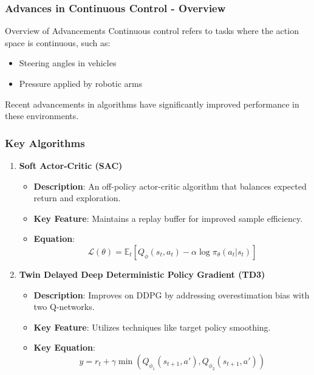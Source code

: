 \documentclass[aspectratio=169]{beamer}
\begin{document}
\begin{frame}[fragile]
    \frametitle{Advances in Continuous Control - Overview}
    \begin{block}{Overview of Advancements}
        Continuous control refers to tasks where the action space is continuous, such as:
        \begin{itemize}
            \item Steering angles in vehicles
            \item Pressure applied by robotic arms
        \end{itemize}
        Recent advancements in algorithms have significantly improved performance in these environments.
    \end{block}
\end{frame}

\begin{frame}[fragile]
    \frametitle{Key Algorithms}
    \begin{enumerate}
        \item \textbf{Soft Actor-Critic (SAC)}
            \begin{itemize}
                \item \textbf{Description}: An off-policy actor-critic algorithm that balances expected return and exploration.
                \item \textbf{Key Feature}: Maintains a replay buffer for improved sample efficiency.
                \item \textbf{Equation}:
                \begin{equation}
                    \mathcal{L}(\theta) = \mathbb{E}_{t}\left[Q_{\phi}(s_t, a_t) - \alpha \log \pi_{\theta}(a_t|s_t)\right]
                \end{equation}
            \end{itemize}

        \item \textbf{Twin Delayed Deep Deterministic Policy Gradient (TD3)}
            \begin{itemize}
                \item \textbf{Description}: Improves on DDPG by addressing overestimation bias with two Q-networks.
                \item \textbf{Key Feature}: Utilizes techniques like target policy smoothing.
                \item \textbf{Key Equation}:
                \begin{equation}
                    y = r_t + \gamma \min(Q_{\phi_1}(s_{t+1}, a'), Q_{\phi_2}(s_{t+1}, a'))
                \end{equation}
            \end{itemize}


\end{enumerate}
\end{frame}
\end{document}
